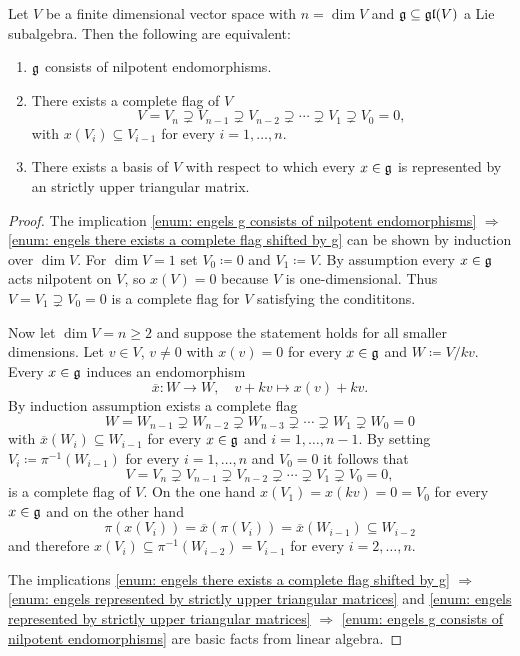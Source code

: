 \begin{prop}\label{prop: stuff for Engels theorem}
 Let $V$ be a finite dimensional vector space with $n = \dim V$ and $\mathfrak{g} \subseteq \mathfrak{gl}(V)$ a Lie subalgebra. Then the following are equivalent:
 \begin{enumerate}
  \item\label{enum: engels g consists of nilpotent endomorphisms}
   $\mathfrak{g}$ consists of nilpotent endomorphisms.
  \item\label{enum: engels there exists a complete flag shifted by g}
   There exists a complete flag of $V$
   \[
    V = V_n \supsetneq V_{n-1} \supsetneq V_{n-2} \supsetneq \dotsb \supsetneq V_1 \supsetneq V_0 = 0,
   \]
   with $x(V_i) \subseteq V_{i-1}$ for every $i = 1, \dotsc, n$.
  \item\label{enum: engels represented by strictly upper triangular matrices}
   There exists a basis of $V$ with respect to which every $x \in \mathfrak{g}$ is represented by an strictly upper triangular matrix.
 \end{enumerate}
\end{prop}
\begin{proof}
 The implication \ref{enum: engels g consists of nilpotent endomorphisms} $\Rightarrow$ \ref{enum: engels there exists a complete flag shifted by g} can be shown by induction over $\dim V$. For $\dim V = 1$ set $V_0 \coloneqq 0$ and $V_1 \coloneqq V$. By assumption every $x \in \mathfrak{g}$ acts nilpotent on $V$, so $x(V) = 0$ because $V$ is one-dimensional. Thus $V = V_1 \supsetneq V_0 = 0$ is a complete flag for $V$ satisfying the condititons.
   
 Now let $\dim V = n \geq 2$ and suppose the statement holds for all smaller dimensions. Let $v \in V$, $v \neq 0$ with $x(v) = 0$ for every $x \in \mathfrak{g}$ and $W \coloneqq V / kv$. Every $x \in \mathfrak{g}$ induces an endomorphism
 \[
  \overline{x} \colon W \to W, \quad v + kv \mapsto x(v) + kv.
 \]
 By induction assumption exists a complete flag
 \[
  W = W_{n-1} \supsetneq W_{n-2} \supsetneq W_{n-3} \supsetneq \dotsb \supsetneq W_1 \supsetneq W_0 = 0
 \]
 with $\overline{x}(W_i) \subseteq W_{i-1}$ for every $x \in \mathfrak{g}$ and $i = 1, \dotsc, n-1$. By setting $V_i \coloneqq \pi^{-1}(W_{i-1})$ for every $i = 1, \dotsc, n$ and $V_0 = 0$ it follows that
 \[
  V = V_n \supsetneq V_{n-1} \supsetneq V_{n-2} \supsetneq \dotsb \supsetneq V_1 \supsetneq V_0 = 0,
 \]
 is a complete flag of $V$. On the one hand $x(V_1) = x(kv) = 0 = V_0$ for every $x \in \mathfrak{g}$ and on the other hand
 \[
  \pi(x(V_i))
  = \overline{x}(\pi(V_i))
  = \overline{x}(W_{i-1})
  \subseteq W_{i-2}
 \]
 and therefore $x(V_i) \subseteq \pi^{-1}(W_{i-2}) = V_{i-1}$ for every $i = 2, \dotsc, n$.
 
 The implications \ref{enum: engels there exists a complete flag shifted by g} $\Rightarrow$ \ref{enum: engels represented by strictly upper triangular matrices} and \ref{enum: engels represented by strictly upper triangular matrices} $\Rightarrow$ \ref{enum: engels g consists of nilpotent endomorphisms} are basic facts from linear algebra.
\end{proof}





